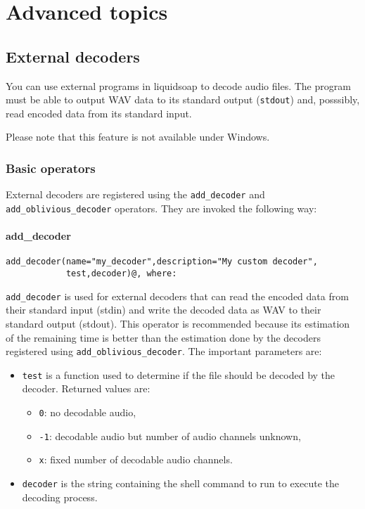 \documentclass{book}
\begin{document}
\chapter{Advanced topics}
\section{External decoders}
You can use external programs in liquidsoap to decode audio files. The program must be able to
output WAV data to its standard output (\verb+stdout+) and, posssibly, read encoded data from its 
standard input.

Please note that this feature is not available under Windows.

\subsection{Basic operators}
External decoders are registered using the \verb+add_decoder+ and \verb+add_oblivious_decoder+ operators. 
They are invoked the following way: 

\subsubsection{add\_decoder}
\begin{verbatim}
add_decoder(name="my_decoder",description="My custom decoder",
            test,decoder)@, where:
\end{verbatim}
\verb+add_decoder+ is used for external decoders that can read the encoded data from their standard
input (stdin) and write the decoded data as WAV to their standard output (stdout). This operator
is recommended because its estimation of the remaining time is better than the estimation done
by the decoders registered using \verb+add_oblivious_decoder+. The important parameters are:

\begin{itemize}
\item \verb+test+ is a function used to determine if the file should be decoded by the decoder. Returned values are: \begin{itemize}
\item \verb+0+: no decodable audio, 
\item \verb+-1+: decodable audio but number of audio channels unknown, 
\item \verb+x+: fixed number of decodable audio channels.

\end{itemize}

\item \verb+decoder+ is the string containing the shell command to run to execute the decoding process.

\end{itemize}
\end{document}
